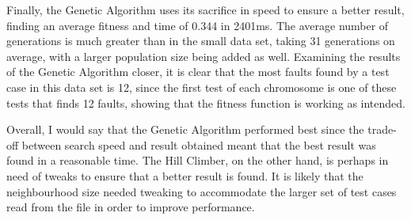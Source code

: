 \documentclass[11pt, a4paper]{article}
\begin{document}
Finally, the Genetic Algorithm uses its sacrifice in speed to ensure a better
result, finding an average fitness and time of 0.344 in 2401ms. The average
number of generations is much greater than in the small data set, taking 31
generations on average, with a larger population size being added as well. 
Examining the results of the Genetic Algorithm closer, it is clear that the most
faults found by a test case in this data set is 12, since the first test of
each chromosome is one of these tests that finds 12 faults, showing that the
fitness function is working as intended.

Overall, I would say that the Genetic Algorithm performed best since the
trade-off between search speed and result obtained meant that the best result
was found in a reasonable time. The Hill Climber, on the other hand, is perhaps
in need of tweaks to ensure that a better result is found. It is likely that the
neighbourhood size needed tweaking to accommodate the larger set of test cases
read from the file in order to improve performance.


 
\end{document}

